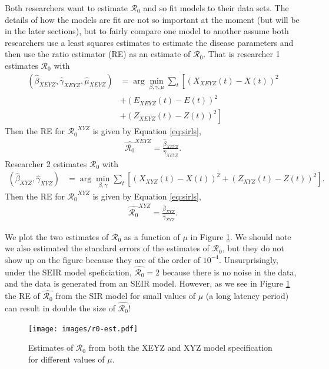 \documentclass[12pt]{article}
\newcommand{\rr}{\ensuremath{\mathcal{R}_0}}
\begin{document}
Both researchers want to estimate $\rr$ and so fit models to their data sets.  The details of how the models are fit are not so important at the moment (but will be in the later sections), but to fairly compare one model to another assume both researchers use a least squares estimates to estimate the disease parameters and then use the ratio estimator (RE) as an estimate of $\rr$.  That is researcher 1 estimates $\rr$ with
\begin{align*}
  (\hat{\beta}_{XEYZ}, \hat{\gamma}_{XEYZ}, \hat{\mu}_{XEYZ} )&=\arg \min_{\beta, \gamma, \mu} \sum_{t} \left [ \left (X_{XEYZ}(t) - X(t)\right )^2  \right . \\
                                                                 &+\left ( E_{XEYZ}(t) - E(t) \right )^2  \\
  &\left . + \left ( Z_{XEYZ}(t) - Z(t) \right )^2\right ]
\end{align*}
Then the RE for $\rr^{XYZ}$ is given by Equation \ref{eq:sirls},
\begin{align*}
  \hat{\rr}^{XEYZ}= \frac{\hat{\beta}_{XEYZ}}{\hat{\gamma}_{XEYZ}}.
\end{align*}
Researcher 2 estimates $\rr$ with 
\begin{align*}
(\hat{\beta}_{XYZ}, \hat{\gamma}_{XYZ} )&=\arg \min_{\beta, \gamma} \sum_{t} \left [ \left (X_{XYZ}(t) - X(t)\right )^2 + \left ( Z_{XYZ}(t) - Z(t) \right )^2 \right ].
\end{align*}
Then the RE for $\rr^{XYZ}$ is given by Equation \ref{eq:sirls},
\begin{align*}
  \hat{\rr}^{XYZ}= \frac{\hat{\beta}_{XYZ}}{\hat{\gamma}_{XYZ}}.
\end{align*}

We plot the two estimates of $\rr$ as a function of $\mu$ in Figure \ref{fig:r0-alpha}.  We should note we also estimated the standard errors of the estimates of $\rr$, but they do not show up on the figure because they are of the order of $10^{-4}$.  Unsurprisingly, under the SEIR model speficiation, $\hat{\rr}=2$ because there is no noise in the data, and the data is generated from an SEIR model.  However, as we see in Figure \ref{fig:r0-alpha} the RE of $\hat{\rr}$ from the SIR model for small values of $\mu$ (a long latency period) can result in double the size of $\hat{\rr}$!

\begin{figure}
  \centering
  \texttt{[image: images/r0-est.pdf]}
  \caption{Estimates of $\rr$ from both the XEYZ and XYZ model specification for different values of $\mu$.}\label{fig:r0-alpha}
  \end{figure}
\end{document}
